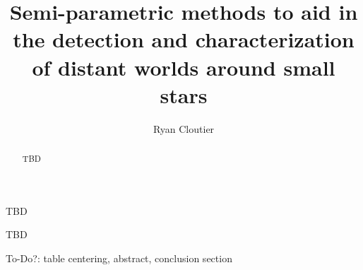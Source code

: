 \documentclass{ut-thesis}
\author{Ryan Cloutier}
\title{Semi-parametric methods to aid in the detection
and characterization of distant worlds around small stars}
\begin{document}
\begin{preliminary}

\maketitle

\begin{abstract}
  TBD
\end{abstract}


\begin{dedication}
  TBD
\end{dedication}
\newpage

\begin{acknowledgements}
  TBD
\end{acknowledgements}
\newpage

\tableofcontents
\listoftables
\listoffigures

\end{preliminary}

To-Do?: table centering, abstract, conclusion section

%





\end{document}
